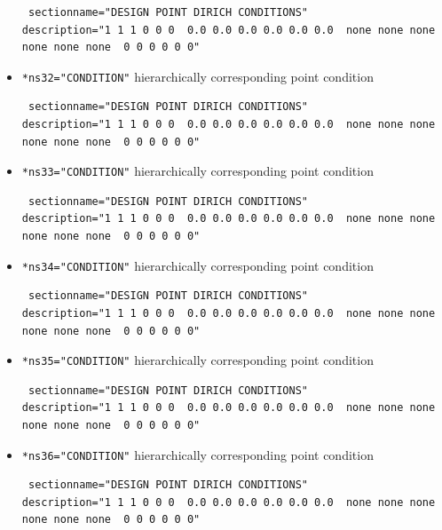 \begin{itemize}
\begin{small} \begin{verbatim} sectionname="DESIGN POINT DIRICH CONDITIONS"
description="1 1 1 0 0 0  0.0 0.0 0.0 0.0 0.0 0.0  none none none none none none  0 0 0 0 0 0"
\end{verbatim} \end{small} \item \verb|*ns32="CONDITION"| \qquad hierarchically corresponding point condition
\begin{small} \begin{verbatim} sectionname="DESIGN POINT DIRICH CONDITIONS"
description="1 1 1 0 0 0  0.0 0.0 0.0 0.0 0.0 0.0  none none none none none none  0 0 0 0 0 0"
\end{verbatim} \end{small} \item \verb|*ns33="CONDITION"| \qquad hierarchically corresponding point condition
\begin{small} \begin{verbatim} sectionname="DESIGN POINT DIRICH CONDITIONS"
description="1 1 1 0 0 0  0.0 0.0 0.0 0.0 0.0 0.0  none none none none none none  0 0 0 0 0 0"
\end{verbatim} \end{small} \item \verb|*ns34="CONDITION"| \qquad hierarchically corresponding point condition
\begin{small} \begin{verbatim} sectionname="DESIGN POINT DIRICH CONDITIONS"
description="1 1 1 0 0 0  0.0 0.0 0.0 0.0 0.0 0.0  none none none none none none  0 0 0 0 0 0"
\end{verbatim} \end{small} \item \verb|*ns35="CONDITION"| \qquad hierarchically corresponding point condition
\begin{small} \begin{verbatim} sectionname="DESIGN POINT DIRICH CONDITIONS"
description="1 1 1 0 0 0  0.0 0.0 0.0 0.0 0.0 0.0  none none none none none none  0 0 0 0 0 0"
\end{verbatim} \end{small} \item \verb|*ns36="CONDITION"| \qquad hierarchically corresponding point condition
\begin{small} \begin{verbatim} sectionname="DESIGN POINT DIRICH CONDITIONS"
description="1 1 1 0 0 0  0.0 0.0 0.0 0.0 0.0 0.0  none none none none none none  0 0 0 0 0 0"

\end{verbatim}
\end{small}
\end{itemize}
